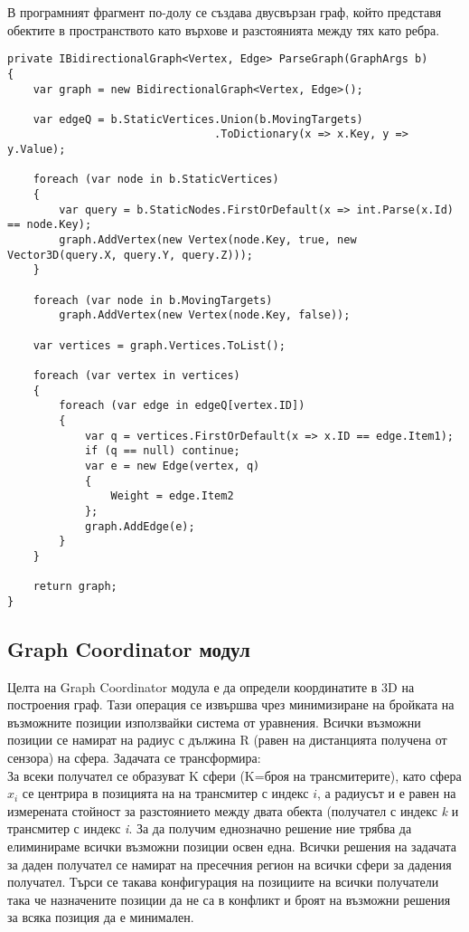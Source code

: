 В програмният фрагмент по-долу се създава двусвързан граф, който представя обектите в пространството като върхове и разстоянията между тях като ребра.
\begin{lstlisting}
private IBidirectionalGraph<Vertex, Edge> ParseGraph(GraphArgs b)
{
    var graph = new BidirectionalGraph<Vertex, Edge>();

    var edgeQ = b.StaticVertices.Union(b.MovingTargets)
                                .ToDictionary(x => x.Key, y => y.Value);

    foreach (var node in b.StaticVertices)
    {
        var query = b.StaticNodes.FirstOrDefault(x => int.Parse(x.Id) == node.Key);
        graph.AddVertex(new Vertex(node.Key, true, new Vector3D(query.X, query.Y, query.Z)));
    }

    foreach (var node in b.MovingTargets)
        graph.AddVertex(new Vertex(node.Key, false));

    var vertices = graph.Vertices.ToList();

    foreach (var vertex in vertices)
    {
        foreach (var edge in edgeQ[vertex.ID])
        {
            var q = vertices.FirstOrDefault(x => x.ID == edge.Item1);
            if (q == null) continue;
            var e = new Edge(vertex, q)
            {
                Weight = edge.Item2
            };
            graph.AddEdge(e);
        }
    }

    return graph;
}
\end{lstlisting}

\pagebreak

\subsection{Graph Coordinator модул}
Целта на Graph Coordinator модула е да определи координатите в 3D на построения граф. Тази операция се извършва чрез минимизиране на бройката на възможните позиции използвайки система от уравнения. Всички възможни позиции се намират на радиус с дължина R (равен на дистанцията получена от сензора) на сфера. Задачата се трансформира:\\

За всеки получател се образуват K сфери (K=броя на трансмитерите), като сфера $x_i$ се центрира в позицията на на трансмитер с индекс $i$, а радиусът и е равен на измерената стойност за разстоянието между двата обекта (получател с индекс \textit{k} и трансмитер с индекс \textit{i}. За да получим еднозначно решение ние трябва да елиминираме всички възможни позиции освен една. Всички решения на задачата за даден получател се намират на пресечния регион на всички сфери за дадения получател. Търси се такава конфигурация на позициите на всички получатели така че назначените позиции да не са в конфликт и броят на възможни решения за всяка позиция да е минимален.\\\\

